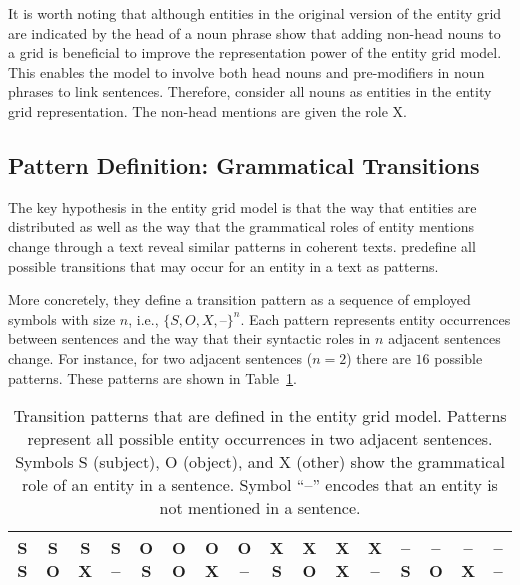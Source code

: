 It is worth noting that although entities in the original version of the entity grid are indicated by the head of a noun phrase 
 show that adding non-head nouns 
to a grid is beneficial to improve the representation power of the entity grid model. 
This enables the model to involve both head nouns and pre-modifiers in noun phrases to link sentences. 
Therefore,  consider all nouns 
as entities in the entity grid representation.  
The non-head mentions are given the role X. 

\subsection{Pattern Definition: Grammatical Transitions}

The key hypothesis in the entity grid model is that the way that entities are distributed as well as the way that the grammatical roles of entity mentions change through a text reveal similar patterns in coherent texts.  
 predefine all possible transitions that may occur for an entity in a text as patterns. 

More concretely, they define a transition pattern as a sequence of employed symbols with size $n$, i.e., $\{ S,O,X,\textit{--} \}^n$. 
Each pattern represents entity occurrences between sentences and the way that their syntactic roles in $n$ adjacent sentences change. 
For instance, for two adjacent sentences ($n=2$) there are $16$ possible patterns.
These patterns are shown in Table~\ref{table:rel-egrid-pattern}. 

\begin{table}[!ht]
	\begin{center}
		\resizebox{\columnwidth}{!}
		{%
			\begin{tabular}{@{}cccccccccccccccc@{}}
			\toprule
			S S & S O & S X & S -- & 
			O S & O O & O X & O -- & 
			X S & X O & X X & X -- & 
			-- S & -- O & -- X & -- -- 
			\\
			\bottomrule	
			\end{tabular}
		}%
	\end{center}
	\caption{
	Transition patterns that are defined in the entity grid model.  
	Patterns represent all possible entity occurrences in two adjacent sentences. 
	Symbols S (subject), O (object), and X (other) show the grammatical role of an entity in a sentence. Symbol ``--'' encodes that an entity is not mentioned in a sentence.
	}
	\label{table:rel-egrid-pattern}
\end{table}


